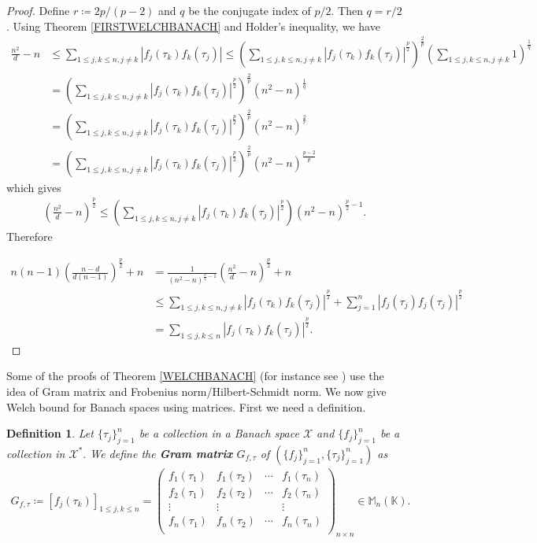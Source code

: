 \documentclass{amsart}
\newtheorem{definition}[theorem]{Definition}
\begin{document}
\begin{proof}
	Define $r\coloneqq 2p/(p-2)$ and $q$ be the conjugate index of $p/2$. Then $q=r/2$. Using Theorem \ref{FIRSTWELCHBANACH} and Holder's inequality, we  have 
\begin{align*}
	\frac{n^2}{d}-n&\leq  \sum_{1\leq j,k \leq n, j\neq k}|f_j(\tau_k)f_k(\tau_j)| \leq \left(\sum_{1\leq j,k \leq n, j\neq k}|f_j(\tau_k)f_k(\tau_j)|^\frac{p}{2}\right)^\frac{2}{p}\left( \sum_{1\leq j,k \leq n, j\neq k} 1\right)^\frac{1}{q}\\
	&=\left(\sum_{1\leq j,k \leq n, j\neq k}|f_j(\tau_k)f_k(\tau_j)|^\frac{p}{2}\right)^\frac{2}{p}(n^2-n)^\frac{1}{q}\\	
	&=\left(\sum_{1\leq j,k \leq n, j\neq k}|f_j(\tau_k)f_k(\tau_j)|^\frac{p}{2}\right)^\frac{2}{p}(n^2-n)^\frac{2}{r}\\	
	&=\left(\sum_{1\leq j,k \leq n, j\neq k}|f_j(\tau_k)f_k(\tau_j)|^\frac{p}{2}\right)^\frac{2}{p}(n^2-n)^\frac{p-2}{p}	
\end{align*}
which gives 
\begin{align*}
	\left(\frac{n^2}{d}-n\right)^\frac{p}{2}\leq \left(\sum_{1\leq j,k \leq n, j\neq k}|f_j(\tau_k)f_k(\tau_j)|^\frac{p}{2}\right)(n^2-n)^{\frac{p}{2}-1}.
\end{align*}
Therefore 

\begin{align*}
	n(n-1)\left(\frac{n-d}{d(n-1)}\right)^\frac{p}{2}+n&=\frac{1}{(n^2-n)^{\frac{p}{2}-1}}	\left(\frac{n^2}{d}-n\right)^\frac{p}{2}+n\\
	&\leq \sum_{1\leq j,k \leq n, j\neq k}|f_j(\tau_k)f_k(\tau_j)|^\frac{p}{2}+\sum_{j=1}^{n}|f_j(\tau_j)f_j(\tau_j)|^\frac{p}{2}\\
&=\sum_{1\leq j,k \leq n}|f_j(\tau_k)f_k(\tau_j)|^\frac{p}{2}.
\end{align*}	
\end{proof}
Some of the proofs of Theorem \ref{WELCHBANACH} (for instance see \cite{ROSENFELD}) use the idea of Gram matrix and Frobenius norm/Hilbert-Schmidt norm. We now give Welch bound for Banach spaces using matrices. First we need a definition.
\begin{definition}\label{GRAMBANACH}
Let $\{\tau_j\}_{j=1}^n$ be a collection in a  Banach space $\mathcal{X}$  and 	$\{f_j\}_{j=1}^n$ be a collection in  $\mathcal{X}^*.$	We define the \textbf{Gram matrix} $G_{f,\tau}$ of  $ (\{f_j \}_{j=1}^n, \{\tau_j \}_{j=1}^n) $ as 
\begin{align*}
G_{f,\tau}\coloneqq [f_j(\tau_k)]_{1\leq j,k \leq n}=\begin{pmatrix}
f_1(\tau_1) & f_1(\tau_2) & \cdots & f_1(\tau_n)\\
f_2(\tau_1) & f_2(\tau_2) & \cdots & f_2(\tau_n)\\
\vdots & \vdots & & \vdots \\
f_n(\tau_1) & f_n(\tau_2) & \cdots & f_n(\tau_n)\\
\end{pmatrix}_{n\times n} 
\in \mathbb{M}_n(\mathbb{K}).
\end{align*}
\end{definition}
\end{document}

